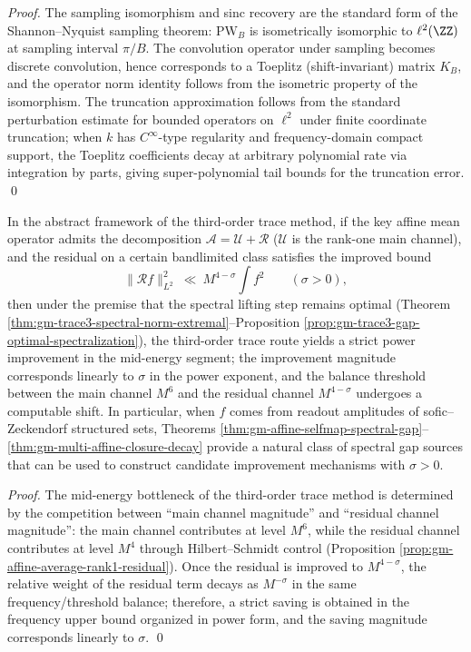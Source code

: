 \begin{proof}
The sampling isomorphism and sinc recovery are the standard form of the Shannon--Nyquist sampling theorem: \(\mathrm{PW}_B\) is isometrically isomorphic to \(\ell^2(\ZZ)\) at sampling interval \(\pi/B\).
The convolution operator under sampling becomes discrete convolution, hence corresponds to a Toeplitz (shift-invariant) matrix \(K_B\), and the operator norm identity follows from the isometric property of the isomorphism.
The truncation approximation follows from the standard perturbation estimate for bounded operators on \(\ell^2\) under finite coordinate truncation; when \(k\) has \(C^\infty\)-type regularity and frequency-domain compact support, the Toeplitz coefficients decay at arbitrary polynomial rate via integration by parts, giving super-polynomial tail bounds for the truncation error. \qed
\end{proof}

\begin{proposition}\label{prop:gm-affine-gap-improves-trace3}
In the abstract framework of the third-order trace method, if the key affine mean operator admits the decomposition \(\mathcal{A}=\mathcal{U}+\mathcal{R}\) (\(\mathcal{U}\) is the rank-one main channel), and the residual on a certain bandlimited class satisfies the improved bound
\[
\|\mathcal{R}f\|_{L^2}^2\ \ll\ M^{4-\sigma}\int f^2
\qquad(\sigma>0),
\]
then under the premise that the spectral lifting step remains optimal (Theorem \ref{thm:gm-trace3-spectral-norm-extremal}--Proposition \ref{prop:gm-trace3-gap-optimal-spectralization}), the third-order trace route yields a strict power improvement in the mid-energy segment; the improvement magnitude corresponds linearly to \(\sigma\) in the power exponent, and the balance threshold between the main channel \(M^6\) and the residual channel \(M^{4-\sigma}\) undergoes a computable shift.
In particular, when \(f\) comes from readout amplitudes of sofic--Zeckendorf structured sets, Theorems \ref{thm:gm-affine-selfmap-spectral-gap}--\ref{thm:gm-multi-affine-closure-decay} provide a natural class of spectral gap sources that can be used to construct candidate improvement mechanisms with \(\sigma>0\).
\end{proposition}

\begin{proof}
The mid-energy bottleneck of the third-order trace method is determined by the competition between ``main channel magnitude'' and ``residual channel magnitude'': the main channel contributes at level \(M^6\), while the residual channel contributes at level \(M^4\) through Hilbert--Schmidt control (Proposition \ref{prop:gm-affine-average-rank1-residual}).
Once the residual is improved to \(M^{4-\sigma}\), the relative weight of the residual term decays as \(M^{-\sigma}\) in the same frequency/threshold balance; therefore, a strict saving is obtained in the frequency upper bound organized in power form, and the saving magnitude corresponds linearly to \(\sigma\). \qed
\end{proof}

